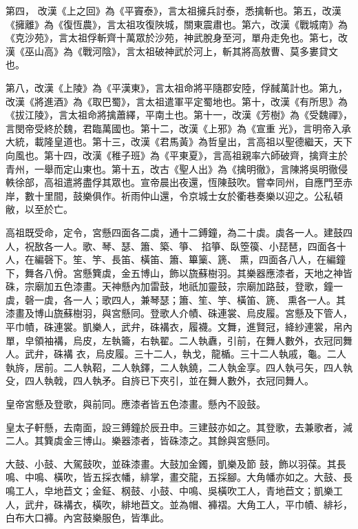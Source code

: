 \begin{pinyinscope}
 第四，
 改漢《上之回》為《平竇泰》，言太祖擁兵討泰，悉擒斬也。第五，改漢《擁離》為《復恆農》，言太祖攻復陜城，關東震肅也。第六，改漢《戰城南》為《克沙苑》，言太祖俘斬齊十萬眾於沙苑，神武脫身至河，單舟走免也。第七，改漢《巫山高》為《戰河陰》，言太祖破神武於河上，斬其將高敖曹、莫多婁貸文也。



 第八，改漢《上陵》為《平漢東》，言太祖命將平隨郡安陸，俘馘萬計也。第九，改漢《將進酒》為《取巴蜀》，言太祖遣軍平定蜀地也。第十，改漢《有所思》為《拔江陵》，言太祖命將擒蕭繹，平南土也。第十一，改漢《芳樹》為《受魏禪》，言閔帝受終於魏，君臨萬國也。第十二，改漢《上邪》為《宣重
 光》，言明帝入承大統，載隆皇道也。第十三，改漢《君馬黃》為哲皇出，言高祖以聖德繼天，天下向風也。第十四，改漢《稚子班》為《平東夏》，言高祖親率六師破齊，擒齊主於青州，一舉而定山東也。第十五，改古《聖人出》為《擒明徹》，言陳將吳明徹侵軼徐部，高祖遣將盡俘其眾也。宣帝晨出夜還，恆陳鼓吹。嘗幸同州，自應門至赤岸，數十里間，鼓樂俱作。祈雨仲山還，令京城士女於衢巷奏樂以迎之。公私頓敝，以至於亡。



 高祖既受命，定令，宮懸四面各二虡，通十二鎛鐘，為二十虡。虡各一人。建鼓四人，祝敔各一人。歌、琴、瑟、簫、築、箏、
 掐箏、臥箜篌、小琵琶，四面各十人，在編磬下。笙、竽、長笛、橫笛、簫、篳篥、篪、熏，四面各八人，在編鐘下，舞各八佾。宮懸簨虡，金五博山，飾以旒蘇樹羽。其樂器應漆者，天地之神皆硃，宗廟加五色漆畫。天神懸內加雷鼓，地祇加靈鼓，宗廟加路鼓，登歌，鐘一虡，磬一虡，各一人；歌四人，兼琴瑟；簫、笙、竽、橫笛、篪、熏各一人。其漆畫及博山旒蘇樹羽，與宮懸同。登歌人介幘、硃連裳、烏皮履。宮懸及下管人，平巾幘，硃連裳。凱樂人，武弁，硃褠衣，履襪。文舞，進賢冠，絳紗連裳，帛內單，皁領袖褠，烏皮，左執籥，右執翟。二人執纛，引前，在舞人數外，衣冠同舞人。武弁，硃褠
 衣，烏皮履。三十二人，執戈，龍楯。三十二人執戚，龜。二人執旍，居前。二人執鞀，二人執鐸，二人執鐃，二人執金享。四人執弓矢，四人執殳，四人執戟，四人執矛。自旍已下夾引，並在舞人數外，衣冠同舞人。



 皇帝宮懸及登歌，與前同。應漆者皆五色漆畫。懸內不設鼓。



 皇太子軒懸，去南面，設三鎛鐘於辰丑申。三建鼓亦如之。其登歌，去兼歌者，減二人。其簨虡金三博山。樂器漆者，皆硃漆之。其餘與宮懸同。



 大鼓、小鼓、大駕鼓吹，並硃漆畫。大鼓加金鐲，凱樂及節
 鼓，飾以羽葆。其長鳴、中鳴、橫吹，皆五採衣幡，緋掌，畫交龍，五採腳。大角幡亦如之。大鼓、長鳴工人，皁地苣文；金鉦、㭎鼓、小鼓、中鳴、吳橫吹工人，青地苣文；凱樂工人，武弁，硃褠衣，橫吹，緋地苣文。並為帽、褲褶。大角工人，平巾幘、緋衫，白布大口褲。內宮鼓樂服色，皆準此。




\end{pinyinscope}
